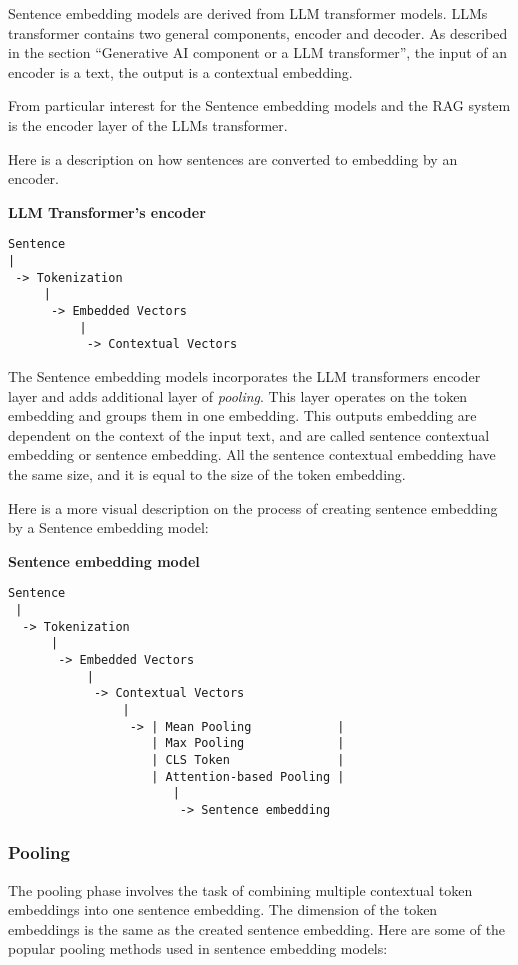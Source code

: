 \documentclass[11pt]{wseas}
\begin{document}
Sentence embedding models are derived from LLM transformer models. LLMs
transformer contains two general components, encoder and decoder. As
described in the section ``Generative AI component or a LLM
transformer'', the input of an encoder is a text, the output is a
contextual embedding.

From particular interest for the Sentence embedding models and the RAG
system is the encoder layer of the LLMs transformer.

Here is a description on how sentences are converted to embedding by an
encoder.

\textbf{LLM Transformer's encoder}

\begin{verbatim}
Sentence
|
 -> Tokenization
     |
      -> Embedded Vectors
          |
           -> Contextual Vectors
\end{verbatim}

The Sentence embedding models incorporates the LLM transformers encoder
layer and adds additional layer of \emph{pooling}. This layer operates
on the token embedding and groups them in one embedding. This outputs
embedding are dependent on the context of the input text, and are called
sentence contextual embedding or sentence embedding. All the sentence
contextual embedding have the same size, and it is equal to the size of
the token embedding.

\newpage

Here is a more visual description on the process of creating sentence
embedding by a Sentence embedding model:

\textbf{Sentence embedding model}

\begin{verbatim}
Sentence 
 |
  -> Tokenization
      | 
       -> Embedded Vectors
           | 
            -> Contextual Vectors
                | 
                 -> | Mean Pooling            |  
                    | Max Pooling             | 
                    | CLS Token               |
                    | Attention-based Pooling |
                       | 
                        -> Sentence embedding
\end{verbatim}

    \subsubsection{Pooling}\label{pooling}

The pooling phase involves the task of combining multiple contextual
token embeddings into one sentence embedding. The dimension of the token
embeddings is the same as the created sentence embedding. Here are some
of the popular pooling methods used in sentence embedding models:
\end{document}
